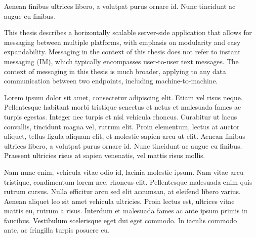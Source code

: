 \documentclass[11pt,twoside,a4paper]{book}
\begin{document}
\bigbreak

Aenean finibus ultrices libero, a volutpat purus ornare id. Nunc tincidunt ac augue eu finibus. 





 
\abstractpage

This thesis describes a horizontally scalable server-side application that allows for messaging between multiple platforms, with emphasis on modularity and easy expandability. Messaging in the context of this thesis does not refer to instant messaging (IM), which typically encompasses user-to-user text messages. The context of messaging in this thesis is much broader, applying to any data communication between two endpoints, including machine-to-machine.


\baselineskip

\noindent
 Lorem ipsum dolor sit amet, consectetur adipiscing elit. Etiam vel risus neque. Pellentesque habitant morbi tristique senectus et netus et malesuada fames ac turpis egestas. Integer nec turpis et nisl vehicula rhoncus. Curabitur ut lacus convallis, tincidunt magna vel, rutrum elit. Proin elementum, lectus at auctor aliquet, tellus ligula aliquam elit, et molestie sapien arcu ut elit. Aenean finibus ultrices libero, a volutpat purus ornare id. Nunc tincidunt ac augue eu finibus. Praesent ultricies risus at sapien venenatis, vel mattis risus mollis.

Nam nunc enim, vehicula vitae odio id, lacinia molestie ipsum. Nam vitae arcu tristique, condimentum lorem nec, rhoncus elit. Pellentesque malesuada enim quis rutrum cursus. Nulla efficitur arcu sed elit accumsan, at eleifend libero varius. Aenean aliquet leo sit amet vehicula ultricies. Proin lectus est, ultrices vitae mattis eu, rutrum a risus. Interdum et malesuada fames ac ante ipsum primis in faucibus. Vestibulum scelerisque eget dui eget commodo. In iaculis commodo ante, ac fringilla turpis posuere eu. 



\tableofcontents



\listoffigures
\end{document}
